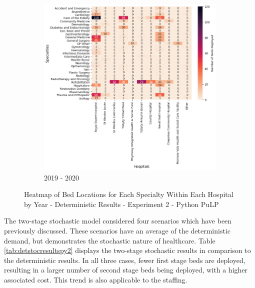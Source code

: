 \documentclass[../thesis.tex]{subfiles}
\begin{document}
\hfill
\begin{figure}\ContinuedFloat
     \begin{subfigure}{0.8\textwidth}
         \centering
         \includegraphics[width=\textwidth]{Chapters/Chapter5/Figures/2019DET.png}
         \caption{2019 - 2020}
         \label{fig:detexppy2c}
     \end{subfigure}
        \caption{Heatmap of Bed Locations for Each Specialty Within Each Hospital by Year - Deterministic Results - Experiment 2 - Python PuLP}
        \label{fig:detexppy2}
\end{figure}

The two-stage stochastic model considered four scenarios which have been previously discussed. These scenarios have an average of the deterministic demand, but demonstrates the stochastic nature of healthcare. Table \ref{tab:detstocresultspy2} displays the two-stage stochastic results in comparison to the deterministic results. In all three cases, fewer first stage beds are deployed, resulting in a larger number of second stage beds being deployed, with a higher associated cost. This trend is also applicable to the staffing. 
\end{document}
